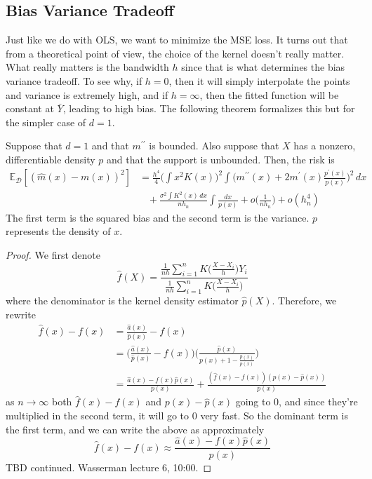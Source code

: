 \subsection{Bias Variance Tradeoff}

  Just like we do with OLS, we want to minimize the MSE loss. It turns out that from a theoretical point of view, the choice of the kernel doesn't really matter. What really matters is the bandwidth $h$ since that is what determines the bias variance tradeoff. To see why, if $h = 0$, then it will simply interpolate the points and variance is extremely high, and if $h = \infty$, then the fitted function will be constant at $\bar{Y}$, leading to high bias. The following theorem formalizes this but for the simpler case of $d = 1$. 

  \begin{theorem}
    Suppose that $d = 1$ and that $m^{\prime\prime}$ is bounded. Also suppose that $X$ has a nonzero, differentiable density $p$ and that the support is unbounded. Then, the risk is 
    \begin{align}
      \mathbb{E}_{\mathcal{D}} \left[ (\hat{m}(x) - m(x))^2 \right] & = \frac{h^4}{4} \bigg( \int x^2 K(x) \bigg)^2 \int \bigg( m^{\prime\prime} (x) + 2m^\prime (x) \frac{p^\prime (x)}{p(x)} \bigg)^2 \,dx \\
          & \;\;\; + \frac{\sigma^2 \int K^2(x)\,dx} {n h_n} \int \frac{dx}{p(x)} + o \bigg( \frac{1}{n h_n} \bigg) + o(h_n^4) 
    \end{align}
    The first term is the squared bias and the second term is the variance. $p$ represents the density of $x$. 
  \end{theorem}
  \begin{proof}
    We first denote 
    \begin{equation}
      \hat{f}(X) = \frac{\frac{1}{nh} \sum_{i=1}^n K \bigg( \frac{X - X_i}{h} \bigg) Y_i}{\frac{1}{nh} \sum_{i=1}^n K \bigg( \frac{X - X_i}{h} \bigg)} 
    \end{equation}
    where the denominator is the kernel density estimator $\hat{p}(X)$. Therefore, we rewrite
    \begin{align}
      \hat{f} (x) - f(x) & = \frac{\hat{a}(x)}{\hat{p}(x)} - f(x) \\
                         & = \bigg( \frac{\hat{a}(x)}{\hat{p}(x)} - f(x) \bigg) \bigg( \frac{\hat{p}(x)}{p(x) + 1 - \frac{\hat{p}(x)}{p(x)}} \bigg) \\
                         & = \frac{\hat{a}(x) - f(x) \hat{p}(x)}{p(x)} + \frac{(\hat{f}(x) - f(x)) (p(x) - \hat{p}(x))}{p(x)}
    \end{align}
    as $n \rightarrow \infty$ both $\hat{f}(x) - f(x)$ and $p(x) - \hat{p}(x)$ going to $0$, and since they're multiplied in the second term, it will go to $0$ very fast. So the dominant term is the first term, and we can write the above as approximately 
    \begin{equation}
      \hat{f}(x) - f(x) \approx  \frac{\hat{a}(x) - f(x) \hat{p}(x)}{p(x)}
    \end{equation}
    TBD continued. Wasserman lecture 6, 10:00. 
  \end{proof}

